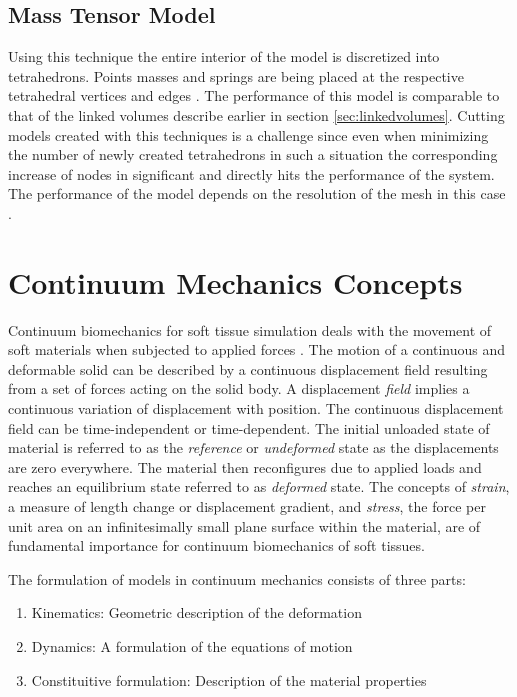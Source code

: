 \subsection{Mass Tensor Model}
Using this technique the entire interior of the model is discretized into tetrahedrons. Points masses and springs are 
being placed at the respective tetrahedral vertices and edges \cite{de1999modeling}. The performance of this model is comparable to that of the 
linked volumes describe earlier in section \ref{sec:linkedvolumes}. Cutting models created with this techniques is a challenge since even when
minimizing the number of newly created tetrahedrons in such a situation the corresponding increase of nodes in significant and directly hits the
performance of the system. The performance of the model depends on the resolution of the mesh in this case \cite{picinbono2000real}. 


\section{Continuum Mechanics Concepts} 
Continuum biomechanics for soft tissue simulation deals with the movement of soft materials when subjected to applied forces \cite{Sifakis2012}. 
The motion of a continuous and deformable solid can be described by a continuous displacement field resulting from a set of 
forces acting on the solid body. A displacement \textit{field} implies a continuous variation of displacement with position. 
The continuous displacement field can be time-independent or time-dependent. The initial unloaded state of material is referred to 
as the \textit{reference} or \textit{undeformed} state as the displacements are zero everywhere. The material then reconfigures due to 
applied loads and reaches an equilibrium state referred to as \textit{deformed} state. The concepts of \textit{strain}, a measure of length
change or displacement gradient, and \textit{stress}, the force per unit area on an infinitesimally small plane surface within the material, 
are of fundamental importance for continuum biomechanics of soft tissues. 

The formulation of models in continuum mechanics consists of three parts:

\begin{enumerate}
 \item Kinematics: Geometric description of the deformation
 \item Dynamics: A formulation of the equations of motion
 \item Constituitive formulation: Description of the material properties
\end{enumerate}

